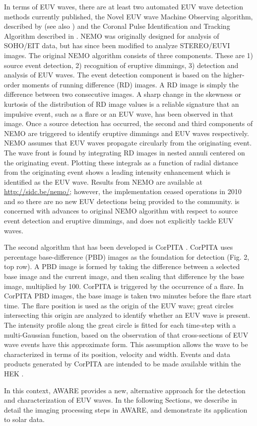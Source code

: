 In terms of EUV waves, there are at least two automated EUV wave
detection methods currently published, the Novel EUV wave Machine
Observing algorithm, described by \cite{2005SoPh..228..265P} (see also
\cite{2012SoPh..276..479P}) and the Coronal Pulse Identification and
Tracking Algorithm described in \cite{2014SoPh..289.3279L}. NEMO was
originally designed for analysis of SOHO/EIT data, but has since been
modified to analyze STEREO/EUVI images. The original NEMO algorithm
\cite{2005SoPh..228..265P} consists of three components. These are 1)
source event detection, 2) recognition of eruptive dimmings, 3)
detection and analysis of EUV waves. The event detection component is
based on the higher-order moments of running difference (RD) images. A
RD image is simply the difference between two consecutive images. A
sharp change in the skewness or kurtosis of the distribution of RD
image values is a reliable signature that an impulsive event, such as
a flare or an EUV wave, has been observed in that image. Once a source
detection has occurred, the second and third components of NEMO are
triggered to identify eruptive dimmings and EUV waves respectively.
NEMO assumes that EUV waves propagate circularly from the originating
event. The wave front is found by integrating RD images in nested
annuli centered on the originating event.  Plotting these integrals as
a function of radial distance from the originating event shows a
leading intensity enhancement which is identified as the EUV wave.
Results from NEMO are available at \url{http://sidc.be/nemo/};
however, the implementation ceased operations in 2010 and so there are
no new EUV detections being provided to the community.
\cite{2012SoPh..276..479P} is concerned with advances to original NEMO
algorithm with respect to source event detection and eruptive
dimmings, and does not explicitly tackle EUV waves.

The second algorithm that has been developed is CorPITA
\citep{2014SoPh..289.3279L}. CorPITA uses percentage base-difference
(PBD) images as the foundation for detection (Fig. 2, top row).  A PBD
image is formed by taking the difference between a selected base image
and the current image, and then scaling that difference by the base
image, multiplied by 100.  CorPITA is triggered by the occurrence of a
flare.  In CorPITA PBD images, the base image is taken two minutes
before the flare start time. The flare position is used as the origin
of the EUV wave; great circles intersecting this origin are analyzed
to identify whether an EUV wave is present. The intensity profile
along the great circle is fitted for each time-step with a
multi-Gaussian function, based on the observation of
\cite{2006ApJ...645..757W} that cross-sections of EUV wave events have
this approximate form. This assumption allows the wave to be
characterized in terms of its position, velocity and width. Events and
data products generated by CorPITA are intended to be made available
within the HEK \citep{hek2012, 2012SoPh..275...79M}.  

In this context, AWARE provides a new, alternative approach for the
detection and characterization of EUV waves.  In the following
Sections, we describe in detail the imaging processing steps in AWARE,
and demonstrate its application to solar data.
